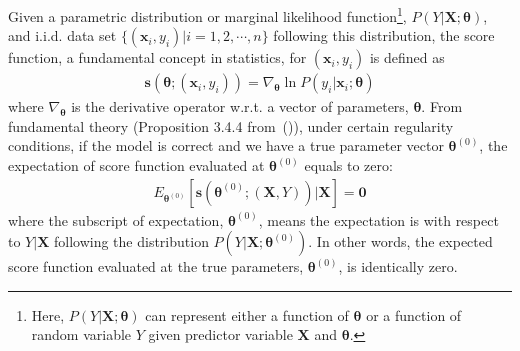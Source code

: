 \documentclass[twoside,11pt]{article}
\begin{document}
Given a parametric distribution or {marginal} likelihood function\footnote{Here, $P(Y|\bm{X};\bm{\theta})$ can represent either a function of $\bm { \theta}$ or a function of random variable $Y$ given predictor variable $\bm {X}$ and $\bm { \theta}$.}, {$P(Y | \bm {X}; \bm{\theta})$}, and i.i.d. data set $\{(\bm {x}_i, y_i) | i = 1,2, \cdots, n\}$ following this distribution, the score function, a fundamental concept in statistics, for $ (\bm {x}_i, y_i)$ is defined as 
\begin{align}
\bm{s}(\bm { \theta}; (\bm {x}_i, y_i)) = \nabla _{\bm { \theta}} { \ln {P(y_i | \bm {x}_i; \bm{\theta})}}
\label{eqn:score_func}
\end{align}
where $\nabla _{\bm { \theta}}$ is the derivative operator w.r.t. a vector of parameters, $\bm {\theta}$. From fundamental theory (Proposition 3.4.4 from~(\cite{bickel2015mathematical})), under certain regularity conditions, if the model is correct and we have a true parameter vector {$\bm { \theta} ^{ (0)}$}, the expectation of score function evaluated at $\bm { \theta} ^{ (0)}$ equals to zero:
\begin{align}
E_{\bm { \theta} ^{ (0)}}[\bm{s}(\bm { \theta}^{ (0)};(\bm {X}, Y))|\bm {X}] = \bm{0}
\label{eqn:score_exp_zero}
\end{align}
where the subscript of expectation, $\bm { \theta} ^{ (0)}$, means the expectation is with respect to $Y|\bm{X}$ following the distribution $P(Y|\bm{X};\bm{\theta}^{(0)})$. In other words, the expected score function evaluated at the true parameters, $\bm { \theta} ^{ (0)}$, is identically zero.
\end{document}
